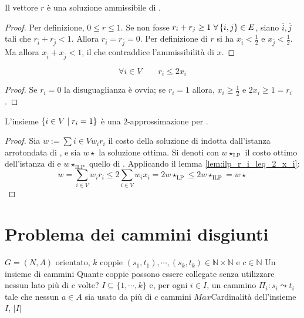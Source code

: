 \begin{lemma}\label{lem:ilp_r_ammiss}
	Il vettore $r$ è una soluzione ammissibile di \IntegerLinearProgramming.
\end{lemma}
\begin{proof}
	Per definizione, $0\leq r\leq 1$. Se non fosse $r_i+r_j\geq 1~\forall \left\{ i,j \right\}\in E$, siano $\bar i,\bar j$ tali che $r_{\bar i}+r_{\bar j}<1$.
	Allora $r_{\bar i}=r_{\bar j}=0$. Per definizione di $r$ si ha $x_{\bar i}<\frac 12$ e $x_{\bar j}<\frac 12$.
	Ma allora $x_{\bar i}+x_{\bar j}<1$, il che contraddice l'ammissibilità di $x$.
\end{proof}

\begin{lemma}\label{lem:ilp_r_i_leq_2_x_i}
	\begin{equation*}
		\forall i\in V \qquad r_i \leq 2x_i
	\end{equation*}
\end{lemma}
\begin{proof}
	Se $r_i=0$ la disuguaglianza è ovvia;
	se $r_i=1$ allora, $x_i\geq \frac 12$ e $2x_i\geq 1=r_i$.
\end{proof}

\begin{theorem}\label{lem:ilp_appr}
	L'insieme $\left\{ i\in V\mid r_i=1 \right\}$ è una $2$-approssimazione per \VertexCover.
\end{theorem}
\begin{proof}
	Sia $w:=\sum{i\in V} w_i r_i$ il costo della soluzione di \VertexCover indotta dall'istanza arrotondata di \LinearProgramming, e sia $w\star$ la soluzione ottima. Si denoti con $w\star_{\text{LP}}$ il costo ottimo dell'istanza di \LinearProgramming e $w\star_{\text{ILP}}$ quello di \IntegerLinearProgramming.
	Applicando il lemma \ref{lem:ilp_r_i_leq_2_x_i}:
	\begin{equation*}
		w = \sum_{i\in V} w_i r_i \leq 2\sum_{i\in V} w_i x_i = 2w\star_{\text{LP}} \leq 2w\star_{\text{ILP}} = w\star
	\end{equation*}
\end{proof}



\section{Problema dei cammini disgiunti}
 {$G = (N,A)$ orientato, $k$ coppie
	$(s_1, t_1), \cdots, (s_k,t_k) \in \mathbb{N} \times \mathbb{N}$ e
	$c \in \mathbb{N}$}
{Un insieme di cammini}
{Quante coppie possono essere collegate senza utilizzare nessun lato più di $c$ volte?}
{$I \subseteq \{1,\cdots,k\}$ e, per ogni $i \in I$, un cammino $\Pi_i : s_i \leadsto t_i$
	tale che nessun $a \in A$ sia usato da più di $c$ cammini}
{$Max$}{Cardinalità dell'insieme $I$, $|I|$}

